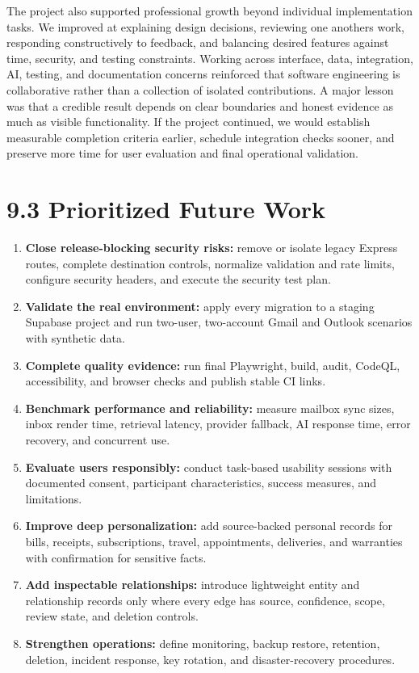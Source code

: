 \documentclass[
]{report}
\providecommand{\tightlist}{%
  \setlength{\itemsep}{0pt}\setlength{\parskip}{0pt}}
\begin{document}
The project also supported professional growth beyond individual
implementation tasks. We improved at explaining design decisions,
reviewing one another\textquotesingle s work, responding constructively
to feedback, and balancing desired features against time, security, and
testing constraints. Working across interface, data, integration, AI,
testing, and documentation concerns reinforced that software engineering
is collaborative rather than a collection of isolated contributions. A
major lesson was that a credible result depends on clear boundaries and
honest evidence as much as visible functionality. If the project
continued, we would establish measurable completion criteria earlier,
schedule integration checks sooner, and preserve more time for user
evaluation and final operational validation.

\section{9.3 Prioritized Future Work}\label{93-prioritized-future-work}

\begin{enumerate}
\def\labelenumi{\arabic{enumi}.}
\tightlist
\item
  \textbf{Close release-blocking security risks:} remove or isolate
  legacy Express routes, complete destination controls, normalize
  validation and rate limits, configure security headers, and execute
  the security test plan.
\item
  \textbf{Validate the real environment:} apply every migration to a
  staging Supabase project and run two-user, two-account Gmail and
  Outlook scenarios with synthetic data.
\item
  \textbf{Complete quality evidence:} run final Playwright, build,
  audit, CodeQL, accessibility, and browser checks and publish stable CI
  links.
\item
  \textbf{Benchmark performance and reliability:} measure mailbox sync
  sizes, inbox render time, retrieval latency, provider fallback, AI
  response time, error recovery, and concurrent use.
\item
  \textbf{Evaluate users responsibly:} conduct task-based usability
  sessions with documented consent, participant characteristics, success
  measures, and limitations.
\item
  \textbf{Improve deep personalization:} add source-backed personal
  records for bills, receipts, subscriptions, travel, appointments,
  deliveries, and warranties with confirmation for sensitive facts.
\item
  \textbf{Add inspectable relationships:} introduce lightweight entity
  and relationship records only where every edge has source, confidence,
  scope, review state, and deletion controls.
\item
  \textbf{Strengthen operations:} define monitoring, backup restore,
  retention, deletion, incident response, key rotation, and
  disaster-recovery procedures.
\end{enumerate}
\end{document}
